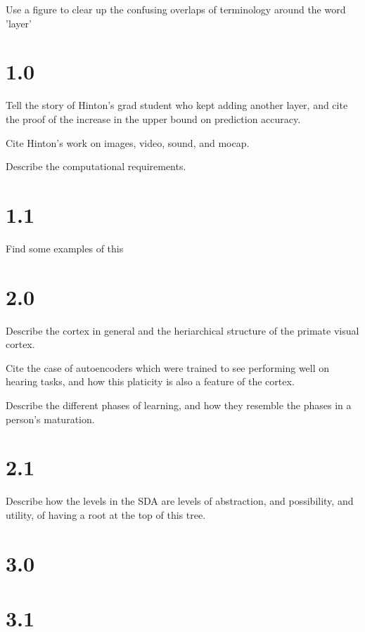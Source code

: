 \documentclass[11pt]{article}
\begin{document}
Use a figure to clear up the confusing overlaps of terminology around the word 'layer'

\section{1.0}
\label{Successes of SDAs on machine perception tasks}

Tell the story of Hinton's grad student who kept adding another layer, and cite the proof of the increase in the upper bound on prediction accuracy.

Cite Hinton's work on images, video, sound, and mocap.

Describe the computational requirements.

\section{1.1}
\label{Applications of SDAs to planning tasks}

Find some examples of this

\section{2.0}
\label{Plausibility of SDA's as a model of the mammalian neocortex}

Describe the cortex in general and the heriarchical structure of the primate visual cortex.

Cite the case of autoencoders which were trained to see performing well on hearing tasks, and how this platicity is also a feature of the cortex.

Describe the different phases of learning, and how they resemble the phases in a person's maturation.

\section{2.1}
\label{Philosophical points}

Describe how the levels in the SDA are levels of abstraction, and possibility, and utility, of having a root at the top of this tree.

\section{3.0}
\label{Expected performace of SDA vs. DA on the competitive growth game, Puerto Rico}

\section{3.1}
\label{implementaion of Puerto Rico}
\end{document}
